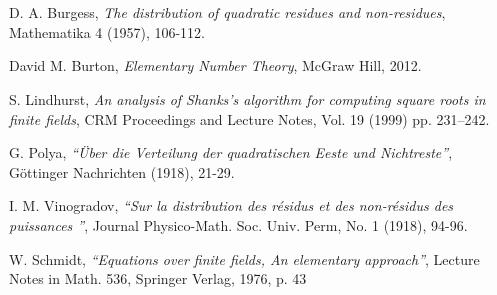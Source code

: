 \documentclass{report}
\begin{document}
\section{}
\begin{thebibliography}{9}

 D. A. Burgess,
\textit{The distribution of quadratic residues and non-residues},
Mathematika 4 (1957), 106-112.

David M. Burton, \textit{Elementary Number Theory},
McGraw Hill, 2012.

S. Lindhurst, \textit{An analysis of Shanks's algorithm for computing square roots in finite fields},
CRM Proceedings and Lecture Notes, Vol. 19 (1999) pp. 231–242.

G. Polya,
\textit{``{\"U}ber die Verteilung der quadratischen Eeste und Nichtreste''},
G{\"o}ttinger Nachrichten (1918), 21-29.

I. M. Vinogradov,
\textit{``Sur la distribution des r{\'e}sidus et des non-r{\'e}sidus des puissances ''},
Journal Physico-Math. Soc. Univ. Perm, No. 1 (1918), 94-96.

W. Schmidt,
\textit{``Equations over finite fields, An elementary approach''},
Lecture Notes in Math. 536, Springer Verlag, 1976, p. 43

\end{thebibliography}
%
\end{document}
